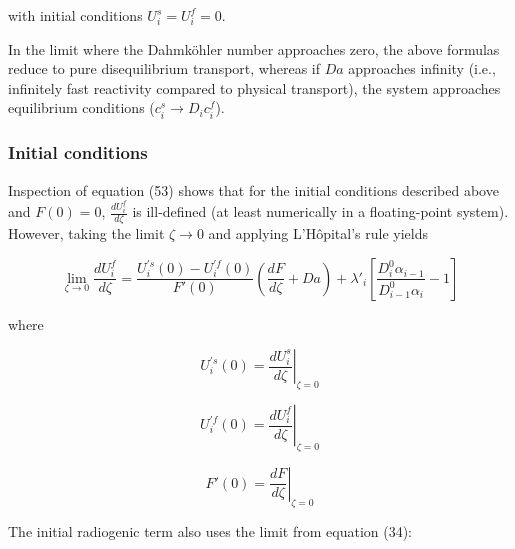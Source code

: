\documentclass[draft]{agujournal2019}
\begin{document}
with initial conditions $U_i^s = U_i^f = 0$.

In the limit where the Dahmköhler number approaches zero, the above formulas reduce to pure disequilibrium transport, whereas if $Da$ approaches infinity (i.e., infinitely fast reactivity compared to physical transport), the system approaches equilibrium conditions ($c_i^s \rightarrow D_i c_i^f$).


\subsubsection{Initial conditions}

Inspection of equation (53) shows that for the initial conditions described above and $F(0)=0$, $\frac{dU_i^f}{d\zeta}$ is ill-defined (at least numerically in a floating-point system). However, taking the limit $\zeta \rightarrow 0$ and applying L'Hôpital's rule yields

\begin{linenomath*}
\begin{equation}
    \lim_{\zeta \rightarrow 0} \frac{dU_i^f}{d\zeta} = \frac{U_i^{'s}(0) - U_i^{'f}(0)}{F'(0)}\left(\frac{dF}{d\zeta} + Da\right) +  \lambda'_i \left[\frac{D_i^0 \alpha_{i-1}}{D_{i-1}^0 \alpha_i} - 1\right] \label{eq:55}
\end{equation}
\end{linenomath*}

where

\begin{linenomath*}
\begin{equation}
    U_i^{'s}(0) = \left.\frac{dU_i^s}{d\zeta}\right|_{\zeta=0}\label{eq:56}
\end{equation}
\end{linenomath*}

\begin{linenomath*}
\begin{equation}
    U_i^{'f}(0) = \left.\frac{dU_i^f}{d\zeta}\right|_{\zeta=0}\label{eq:57}
\end{equation}
\end{linenomath*}

\begin{linenomath*}
\begin{equation}
    F'(0) = \left.\frac{dF}{d\zeta}\right|_{\zeta=0}\label{eq:58}
\end{equation}
\end{linenomath*}

The initial radiogenic term also uses the limit from equation (34):
\end{document}
